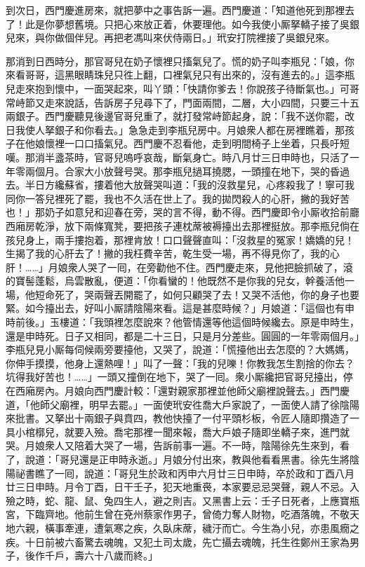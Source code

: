 到次日，西門慶進房來，就把夢中之事告訴一遍。西門慶道：「知道他死到那裡去了！此是你夢想舊境。只把心來放正着，休要理他。如今我使小厮拏轎子接了吳銀兒來，與你做個伴兒。再把老馮叫來伏侍兩日。」玳安打院裡接了吳銀兒來。

那消到日西時分，那官哥兒在奶子懷裡只搐氣兒了。慌的奶子叫李瓶兒：「娘，你來看哥哥，這黑眼睛珠兒只徃上翻，口裡氣兒只有出來的，沒有進去的。」這李瓶兒走來抱到懷中，一面哭起來，叫丫頭：「快請你爹去！你說孩子待斷氣也。」可哥常峙節又走來說話，{}告訴房子兒尋下了，門面兩間，二層，大小四間，只要三十五兩銀子。西門慶聽見後邊官哥兒重了，就打發常峙節起身，說：「我不送你罷，改日我使人拏銀子和你看去。」急急走到李瓶兒房中。月娘衆人都在房裡瞧着，那孩子在他娘懷裡一口口搐氣兒。{}西門慶不忍看他，走到明間椅子上坐着，只長吁短嘆。那消半盞茶時，官哥兒嗚呼哀哉，斷氣身亡。時八月廿三日申時也，只活了一年零兩個月。合家大小放聲号哭。那李瓶兒撾耳撓腮，一頭撞在地下，哭的昏過去。半日方纔蘇省，摟着他大放聲哭叫道：「我的沒救星兒，心疼殺我了！寧可我同你一答兒裡死了罷，我也不久活在世上了。我的拋閃殺人的心肝，撇的我好苦也！」那奶子如意兒和迎春在旁，哭的言不得，動不得。西門慶即令小厮收拾前廳西廂房乾淨，放下兩條寬凳，要把孩子連枕蓆被褥擡出去那裡挺放。那李瓶兒倘在孩兒身上，兩手摟抱着，那裡肯放！口口聲聲直叫：「沒救星的冤家！嬌嬌的兒！生揭了我的心肝去了！撇的我枉費辛苦，乾生受一場，再不得見你了，我的心肝！……」月娘衆人哭了一囘，在旁勸他不住。西門慶走來，見他把臉抓破了，滾的寶髻蓬鬆，烏雲散亂，便道：「你看蠻的！他既然不是你我的兒女，幹養活他一場，他短命死了，哭兩聲丟開罷了，{}如何只顧哭了去！又哭不活他，你的身子也要緊。如今擡出去，好叫小厮請陰陽來看。這是甚麼時候？」月娘道：「這個也有申時前後。」玉樓道：「我頭裡怎麼說來？他管情還等他這個時候纔去。原是申時生，還是申時死。日子又相同，都是二十三日，只是月分差些。圓圓的一年零兩個月。」李瓶兒見小厮每伺候兩旁要擡他，又哭了，說道：「慌擡他出去怎麼的？大媽媽，你伸手摸摸，他身上還熱哩！」{}叫了一聲：「我的兒嚛！你教我怎生割捨的你去？坑得我好苦也！……」一頭又撞倒在地下，哭了一囘。衆小厮纔把官哥兒擡出，停在西廂房內。月娘向西門慶計較：「還對親家那裡並他師父廟裡說聲去。」西門慶道，「他師父廟裡，明早去罷。」一面使玳安徃喬大戶家說了，一面使人請了徐陰陽來批書。又拏出十兩銀子與賁四，教他快擡了一付平頭杉板，令匠人隨即攢造了一具小棺槨兒，就要入殮。喬宅那裡一聞來報，喬大戶娘子隨即坐轎子來，進門就哭。月娘衆人又陪着大哭了一場，告訴前事一遍。不一時，陰陽徐先生來到，看了，說道：「哥兒還是正申時永逝。」月娘分付出來，教與他看看黑書。徐先生將陰陽祕書瞧了一囘，說道：「哥兒生於政和丙申六月廿三日申時，卒於政和丁酉八月廿三日申時。月令丁酉，日干壬子，犯天地重䘮，本家要忌忌哭聲，親人不忌。入殮之時，蛇、龍、鼠、兔四生人，避之則吉。又黑書上云：壬子日死者，上應寶瓶宮，下臨齊地。他前生曾在兗州蔡家作男子，曾倚力奪人財物，吃酒落魄，不敬天地六親，橫事牽連，遭氣寒之疾，久臥床蓆，穢汙而亡。今生為小兒，亦患風癇之疾。十日前被六畜驚去魂魄，又犯土司太歲，先亡攝去魂魄，托生徃鄭州王家為男子，後作千戶，壽六十八歲而終。」

